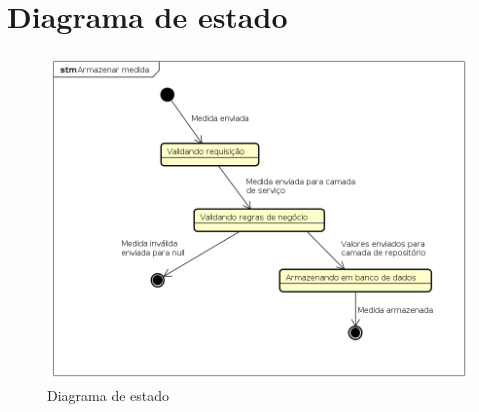 \chapter{Diagrama de estado}

\begin{figure}[H]
    \label{figure_diagrama_estado}
    \centering
    \caption{Diagrama de estado}
    \label{includegraphics_diagrama_estado}
    \includegraphics[scale=0.6]{diagrams/estado.png}
    \hfill
\end{figure}

